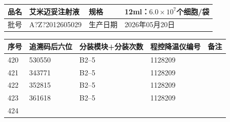 \documentclass[UTF8,10pt,a4paper,fontset=fandol]{ctexart}
\newcommand{\fieldvalue}[1]{#1}
\begin{document}
\small
\begin{center}
\begin{tabular}{|p{2.1cm}|p{5.0cm}|p{2.0cm}|p{4.0cm}|}
\hline
品名 &
\fieldvalue{艾米迈妥注射液} &
规格 &
\fieldvalue{12ml：$6.0\times10^{7}$个细胞/袋}
\\ \hline
批号 &
\fieldvalue{A?Z?2012605029} &
生产日期 &
\fieldvalue{2026年05月20日}
\\ \hline
\end{tabular}

\vspace{2pt}

\begin{tabular}{|p{0.8cm}|p{2.2cm}|p{3.0cm}|p{3.0cm}|p{3.8cm}|}
\hline
序号 & 追溯码后六位 & 分装模块+分装次数 & 程控降温仪编号 & 备注
\\ \hline
\fieldvalue{420} &
\fieldvalue{530550} &
\fieldvalue{B2--5} &
\fieldvalue{1128209} & \\ \hline
\fieldvalue{421} &
\fieldvalue{343771} &
\fieldvalue{B2--5} &
\fieldvalue{1128209} & \\ \hline
\fieldvalue{422} &
\fieldvalue{352815} &
\fieldvalue{B2--5} &
\fieldvalue{1128209} & \\ \hline
\fieldvalue{423} &
\fieldvalue{361618} &
\fieldvalue{B2--5} &
\fieldvalue{1128209} & \\ \hline
\fieldvalue{424} &

\end{tabular}
\end{center}
\end{document}
